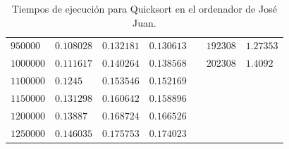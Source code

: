 \documentclass[12pt]{article}
\begin{document}
\begin{table}
\begin{tabular}{|l|l|l|l||l||l|l|}
            $950000$  & $0.108028 $  & $0.132181 $ & $0.130613$ && $192308$ & $1.27353$ \\
            $1000000$ & $0.111617$   & $0.140264$  & $0.138568$ && $202308$ & $1.4092 $\\
            $1100000$ & $0.1245    $ & $0.153546 $ & $0.152169$ && & \\
            $1150000$ & $0.131298  $ & $0.160642 $ & $0.158896$ && & \\
            $1200000$ & $0.13887   $ & $0.168724 $ & $0.166526$ && & \\
            $1250000$ & $0.146035  $ & $0.175753 $ & $0.174023$ && & \\
             \hline
        \end{tabular}
        \caption{Tiempos de ejecución para Quicksort en el ordenador de José Juan.}
        \label{tab:Quicksort_tiempos}
    \end{table}
\end{document}
